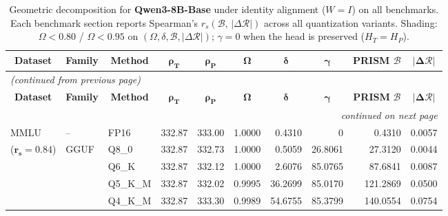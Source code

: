 \begingroup
\small
\setlength{\tabcolsep}{4pt}
\renewcommand{\arraystretch}{1.05}
\setlength{\LTcapwidth}{\textwidth}
\begin{longtable}{ll l rrrrrrr}
\caption{Geometric decomposition for \textbf{Qwen3-8B-Base} under identity alignment ($W{=}I$) on all benchmarks. Each benchmark section reports Spearman's $r_s(\mathcal{B},\,|\Delta\mathcal{R}|)$ across all quantization variants. Shading: \colorbox{red!35}{$\Omega{<}0.80$} / \colorbox{red!18}{$\Omega{<}0.95$} on $(\Omega,\delta,\mathcal{B},|\Delta\mathcal{R}|)$; \colorbox{cyan!12}{$\gamma{=}0$} when the head is preserved ($H_T{=}H_P$).}\label{tab:qwen_decomposition_all_bound}\\
\toprule
\multicolumn{1}{c}{\textbf{Dataset}} & \multicolumn{1}{c}{\textbf{Family}} & \multicolumn{1}{c}{\textbf{Method}} & \multicolumn{1}{c}{$\boldsymbol{\rho_T}$} & \multicolumn{1}{c}{$\boldsymbol{\rho_P}$} & \multicolumn{1}{c}{$\boldsymbol{\Omega}$} & \multicolumn{1}{c}{$\boldsymbol{\delta}$} & \multicolumn{1}{c}{$\boldsymbol{\gamma}$} & \multicolumn{1}{c}{\textbf{PRISM} $\boldsymbol{\mathcal{B}}$} & \multicolumn{1}{c}{$\boldsymbol{|\Delta\mathcal{R}|}$} \\
\midrule
\endfirsthead
\multicolumn{10}{l}{\small\itshape (continued from previous page)}\\
\toprule
\multicolumn{1}{c}{\textbf{Dataset}} & \multicolumn{1}{c}{\textbf{Family}} & \multicolumn{1}{c}{\textbf{Method}} & \multicolumn{1}{c}{$\boldsymbol{\rho_T}$} & \multicolumn{1}{c}{$\boldsymbol{\rho_P}$} & \multicolumn{1}{c}{$\boldsymbol{\Omega}$} & \multicolumn{1}{c}{$\boldsymbol{\delta}$} & \multicolumn{1}{c}{$\boldsymbol{\gamma}$} & \multicolumn{1}{c}{\textbf{PRISM} $\boldsymbol{\mathcal{B}}$} & \multicolumn{1}{c}{$\boldsymbol{|\Delta\mathcal{R}|}$} \\
\midrule
\endhead
\midrule
\multicolumn{10}{r}{\small\itshape continued on next page}\\
\endfoot
\bottomrule
\endlastfoot
MMLU & -- & FP16 & 332.87 & 333.00 & 1.0000 & 0.4310 & \cellcolor{cyan!12} $0$ & 0.4310 & 0.0057 \\
{\small ($\mathbf{r_s{=}0.84}$)} & GGUF & Q8\_0 & 332.87 & 332.73 & 1.0000 & 0.5059 & 26.8061 & 27.3120 & 0.0044 \\
 &  & Q6\_K & 332.87 & 332.12 & 1.0000 & 2.6076 & 85.0765 & 87.6841 & 0.0087 \\
 &  & Q5\_K\_M & 332.87 & 332.02 & 0.9995 & 36.2699 & 85.0170 & 121.2869 & 0.0500 \\
 &  & Q4\_K\_M & 332.87 & 333.30 & 0.9989 & 54.6755 & 85.3799 & 140.0554 & 0.0754 \\

\end{longtable}

